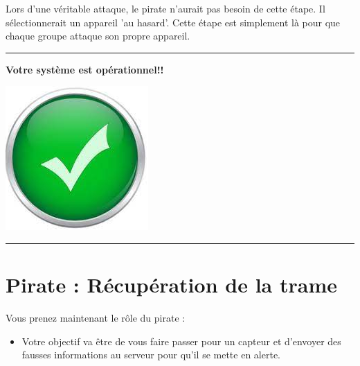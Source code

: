 \documentclass[french, 12pt]{article}%
\newcommand{\itemE}{\item[$\bullet$]}
\newcommand{\titreencadre}{Titre}
\newenvironment{encadre}[1]{\renewcommand{\titreencadre}{#1}
	\begin{mdframed}[style=encadrestyle]
	\vspace{0.5\baselineskip}
	}{%
	\end{mdframed}}
\begin{document}
\begin{encadre}{Rappel : Un vrai pirate}
Lors d'une véritable attaque, le pirate n'aurait pas besoin de cette étape. Il sélectionnerait un appareil 'au hasard'. Cette étape est simplement là pour que chaque groupe attaque son propre appareil.
\end{encadre}

\vspace{0.5cm}
\begin{center}
 \rule{0.75\linewidth}{1pt}
\end{center}
\begin{minipage}[c]{0.59\linewidth}

\textbf{Votre système est opérationnel!!}
\end{minipage}
\begin{minipage}[c]{0.4\linewidth}
\begin{center}
\includegraphics[scale=0.1]{./ressource/OKLogo}
\end{center}
\end{minipage}
\begin{center}
 \rule{0.75\linewidth}{1pt}
\end{center}

\newpage
\section{Pirate : Récupération de la trame}

Vous prenez maintenant le rôle du pirate : 
\begin{itemize}
\itemE Votre objectif va être de vous faire passer pour un capteur et d'envoyer des fausses informations au serveur pour qu'il se mette en alerte.  
\end{itemize}
\end{document}
